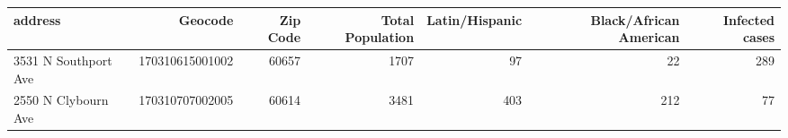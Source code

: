 \begin{tabular}{lrrrrrr}
\toprule
              address &          Geocode &  Zip Code &  Total Population &  Latin/Hispanic &  Black/African American &  Infected cases \\
\midrule
 3531 N Southport Ave &  170310615001002 &     60657 &              1707 &              97 &                      22 &             289 \\
  2550 N Clybourn Ave &  170310707002005 &     60614 &              3481 &             403 &                     212 &              77 \\
\bottomrule
\end{tabular}
